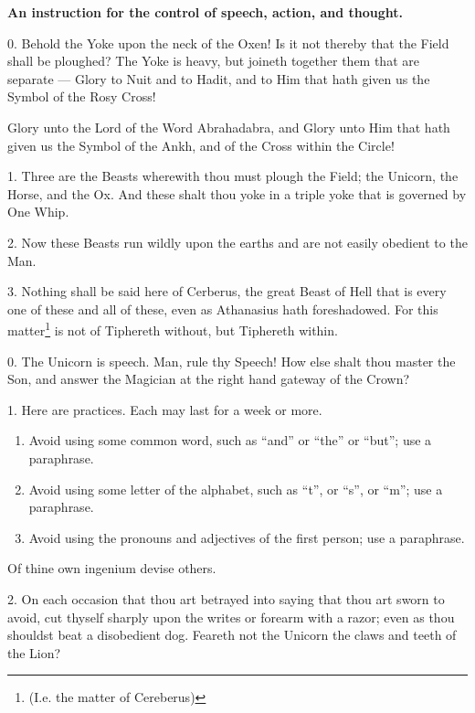 
\textbf{An instruction for the control of speech, action, and thought.}


0. Behold the Yoke upon the neck of the Oxen! Is it not thereby that the Field shall be ploughed? The Yoke is heavy, but joineth together them that are separate --- Glory to Nuit and to Hadit, and to Him that hath given us the Symbol of the Rosy Cross!

Glory unto the Lord of the Word Abrahadabra, and Glory unto Him that hath given us the Symbol of the Ankh, and of the Cross within the Circle!

1. Three are the Beasts wherewith thou must plough the Field; the Unicorn, the Horse, and the Ox. And these shalt thou yoke in a triple yoke that is governed by One Whip.

2. Now these Beasts run wildly upon the earths and are not easily obedient to the Man.

3. Nothing shall be said here of Cerberus, the great Beast of Hell that is every one of these and all of these, even as Athanasius hath foreshadowed. For this matter\footnote{(I.e. the matter of Cereberus)} is not of Tiphereth without, but Tiphereth within.

0. The Unicorn is speech. Man, rule thy Speech! How else shalt thou master the Son, and answer the Magician at the right hand gateway of the Crown?

1. Here are practices. Each may last for a week or more.
\begin{enumerate}[label=\greek*.]
\item Avoid using some common word, such as \enquote{and} or \enquote{the} or \enquote{but}; use a paraphrase.

\item Avoid using some letter of the alphabet, such as \enquote{t}, or \enquote{s}, or \enquote{m}; use a paraphrase.

\item Avoid using the pronouns and adjectives of the first person; use a paraphrase.
\end{enumerate}
Of thine own ingenium devise others.

2. On each occasion that thou art betrayed into saying that thou art sworn to avoid, cut thyself sharply upon the writes or forearm with a razor; even as thou shouldst beat a disobedient dog. Feareth not the Unicorn the claws and teeth of the Lion?

